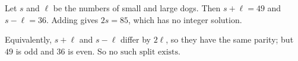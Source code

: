 Let $s$ and $\ell$ be the numbers of small and large dogs. Then $s+\ell=49$ and $s-\ell=36$. Adding gives $2s=85$, which has no integer solution.

Equivalently, $s+\ell$ and $s-\ell$ differ by $2\ell$, so they have the same parity; but $49$ is odd and $36$ is even. So $\boxed{\text{no such split exists}}$.
